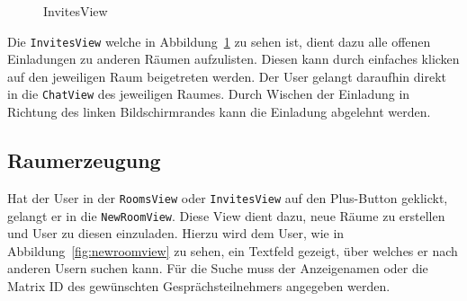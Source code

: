 \begin{figure}[h]
        \centering
        \caption{InvitesView}\label{fig:invitesview}
    \end{figure}
    Die \texttt{InvitesView} welche in Abbildung~\ref{fig:invitesview} zu sehen ist, dient dazu alle offenen Einladungen zu anderen Räumen aufzulisten.
    Diesen kann durch einfaches klicken auf den jeweiligen Raum beigetreten werden.
    Der User gelangt daraufhin direkt in die \texttt{ChatView} des jeweiligen Raumes.
    Durch Wischen der Einladung in Richtung des linken Bildschirmrandes kann die Einladung abgelehnt werden.


    \newpage
    \subsection{Raumerzeugung}\label{subsec:raumerzeugung}
    Hat der User in der \texttt{RoomsView} oder \texttt{InvitesView} auf den Plus-Button geklickt, gelangt er in die \texttt{NewRoomView}.
    Diese View dient dazu, neue Räume zu erstellen und User zu diesen einzuladen.
    Hierzu wird dem User, wie in Abbildung~\ref{fig:newroomview} zu sehen, ein Textfeld gezeigt, über welches er nach anderen Usern suchen kann.
    Für die Suche muss der Anzeigenamen oder die Matrix ID des gewünschten Gesprächsteilnehmers angegeben werden.

